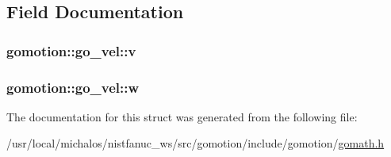 \subsection{Field Documentation}
\hypertarget{structgomotion_1_1go__vel_ad215a05296181ff4207f75155da830fa}{
\subsubsection[{v}]{ gomotion\-::go\-\_\-vel\-::v}}\label{structgomotion_1_1go__vel_ad215a05296181ff4207f75155da830fa}
\hypertarget{structgomotion_1_1go__vel_ae647d5de790b84dad0b91c6f65b998cb}{
\subsubsection[{w}]{ gomotion\-::go\-\_\-vel\-::w}}\label{structgomotion_1_1go__vel_ae647d5de790b84dad0b91c6f65b998cb}


The documentation for this struct was generated from the following file\-:\begin{DoxyCompactItemize}
\item 
/usr/local/michalos/nistfanuc\-\_\-ws/src/gomotion/include/gomotion/\hyperlink{gomath_8h}{gomath.\-h}\end{DoxyCompactItemize}

